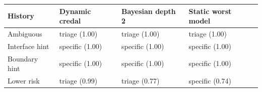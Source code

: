 \begin{tabular}{@{}llll@{}}
\toprule
History & Dynamic credal & Bayesian depth 2 & Static worst model\\
\midrule
Ambiguous & triage (1.00) & triage (1.00) & triage (1.00)\\
Interface hint & specific (1.00) & specific (1.00) & specific (1.00)\\
Boundary hint & specific (1.00) & specific (1.00) & specific (1.00)\\
Lower risk & triage (0.99) & triage (0.77) & specific (0.74)\\
\bottomrule
\end{tabular}
